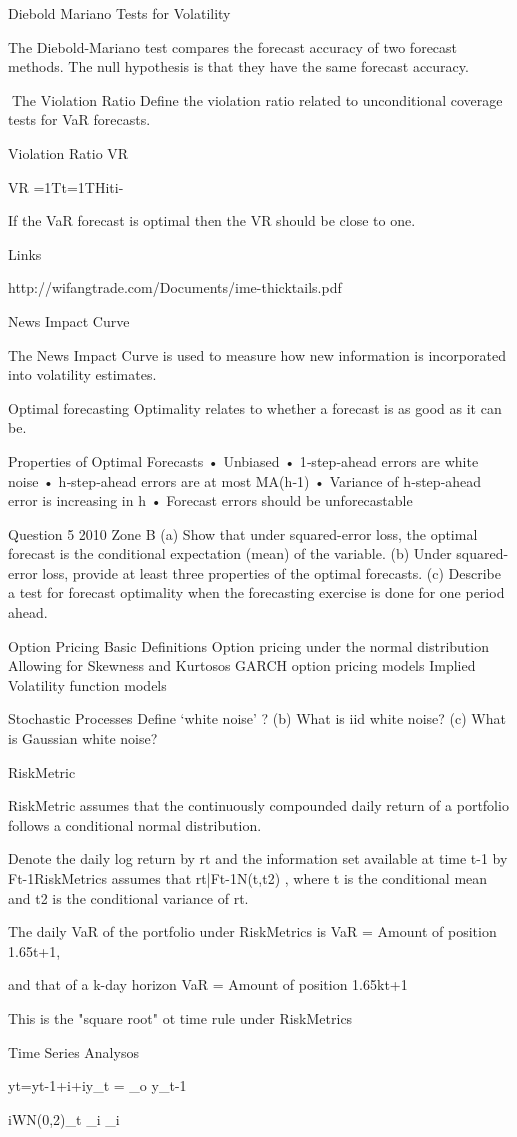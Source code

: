 Diebold Mariano Tests for Volatility

The Diebold-Mariano test compares the forecast accuracy of two forecast methods. The null hypothesis is that they have the same forecast accuracy.


The Violation Ratio
Deﬁne the violation ratio related to unconditional coverage tests for VaR forecasts.
 
 
Violation Ratio VR
 
VR =1Tt=1THiti-
 
If the VaR forecast is optimal then the VR should be close to one.
 
Links

http://wifangtrade.com/Documents/ime-thicktails.pdf

News Impact Curve

The News Impact Curve is used to measure how new information is incorporated into volatility estimates.



Optimal forecasting
Optimality relates to whether a forecast is as good as it can be.

Properties of Optimal Forecasts
• Unbiased
• 1‐step‐ahead errors are white noise
• h‐step‐ahead errors are at most MA(h‐1)
• Variance of h‐step‐ahead error is increasing in h
• Forecast errors should be unforecastable


Question 5 2010 Zone B
(a) Show that under squared-error loss, the optimal forecast is the conditional expectation (mean) of the variable.
(b) Under squared-error loss, provide at least three properties of the optimal forecasts.
(c) Describe a test for forecast optimality when the forecasting exercise is done for one period ahead.



Option Pricing
Basic Definitions
Option pricing under the normal distribution
Allowing for Skewness and Kurtosos
GARCH option pricing models
Implied Volatility function models

Stochastic Processes
Deﬁne ‘white noise’ ?
(b) What is iid white noise?
(c) What is Gaussian white noise?

RiskMetric

RiskMetric assumes that the continuously compounded daily return of a portfolio follows a conditional normal distribution.
 
Denote the daily log return by  rt and the information set available at time  t-1 by  Ft-1RiskMetrics assumes that rt|Ft-1N(t,t2) , where t is the conditional mean and t2 is the conditional variance of rt.
 
The daily VaR of the portfolio under RiskMetrics is VaR = Amount of position 1.65t+1,
 
and that of a k-day horizon VaR = Amount of position  1.65kt+1
 
This is the "square root" ot time rule under RiskMetrics

Time Series Analysos

yt=yt-1+i+iy_{t}  = \theta_o y_{t-1} 
 
iWN(0,2)\theta_{t}
\gamma_i
\epsilon_i

